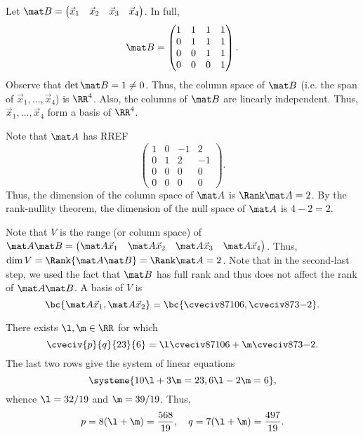 \begin{solution}
    \begin{ppart}
        Let $\mat B = \begin{pmatrix}\vec x_1 & \vec x_2 & \vec x_3 & \vec x_4\end{pmatrix}$. In full, \[\mat B = \begin{pmatrix}1 & 1 & 1 & 1 \\ 0 & 1 & 1 & 1 \\ 0 & 0 & 1 & 1 \\ 0 & 0 & 0 & 1\end{pmatrix}.\] Observe that $\det \mat B = 1 \neq 0$. Thus, the column space of $\mat B$ (i.e. the span of $\vec x_1, \dots, \vec x_4$) is $\RR^4$. Also, the columns of $\mat B$ are linearly independent. Thus, $\vec x_1, \dots, \vec x_4$ form a basis of $\RR^4$.
    \end{ppart}
    \begin{ppart}
        Note that $\mat A$ has RREF \[\begin{pmatrix}1 & 0 & -1 & 2 \\ 0 & 1 & 2 & -1 \\ 0 & 0 & 0 & 0 \\ 0 & 0 & 0 & 0\end{pmatrix}.\] Thus, the dimension of the column space of $\mat A$ is $\Rank \mat A = 2$. By the rank-nullity theorem, the dimension of the null space of $\mat A$ is $4- 2 = 2$.
    \end{ppart}
    \begin{ppart}
        Note that $V$ is the range (or column space) of $\mat A \mat B = \begin{pmatrix}\mat A \vec x_1 & \mat A \vec x_2 & \mat A \vec x_3 & \mat A \vec x_4 \end{pmatrix}$. Thus, $\dim V = \Rank{\mat A \mat B} = \Rank \mat A = 2$. Note that in the second-last step, we used the fact that $\mat B$ has full rank and thus does not affect the rank of $\mat A \mat B$. A basis of $V$ is \[\bc{\mat A \vec x_1, \mat A \vec x_2} = \bc{\cveciv87{10}6, \cveciv873{-2}}.\]
    \end{ppart}
    \begin{ppart}
        There exists $\l, \m \in \RR$ for which \[\cveciv{p}{q}{23}{6} = \l \cveciv87{10}6 + \m \cveciv873{-2}.\] The last two rows give the system of linear equations \[\systeme{10\l + 3\m = 23, 6\l - 2\m = 6},\] whence $\l = 32/19$ and $\m = 39/19$. Thus, \[p = 8(\l + \m) = \frac{568}{19}, \quad q = 7(\l + \m) = \frac{497}{19}.\]
    \end{ppart}
\end{solution}